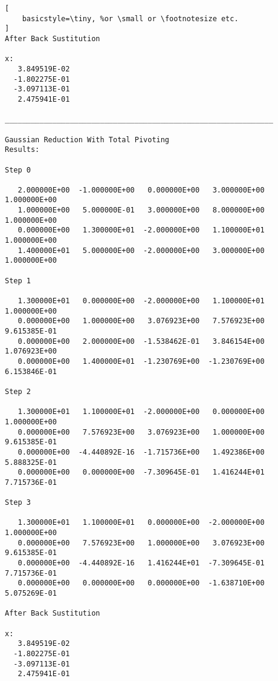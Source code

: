 \documentclass{article}
\begin{document}
\begin{lstlisting}[
    basicstyle=\tiny, %or \small or \footnotesize etc.
]
After Back Sustitution

x:
   3.849519E-02
  -1.802275E-01
  -3.097113E-01
   2.475941E-01

______________________________________________________________

Gaussian Reduction With Total Pivoting
Results:

Step 0

   2.000000E+00  -1.000000E+00   0.000000E+00   3.000000E+00   1.000000E+00
   1.000000E+00   5.000000E-01   3.000000E+00   8.000000E+00   1.000000E+00
   0.000000E+00   1.300000E+01  -2.000000E+00   1.100000E+01   1.000000E+00
   1.400000E+01   5.000000E+00  -2.000000E+00   3.000000E+00   1.000000E+00

Step 1

   1.300000E+01   0.000000E+00  -2.000000E+00   1.100000E+01   1.000000E+00
   0.000000E+00   1.000000E+00   3.076923E+00   7.576923E+00   9.615385E-01
   0.000000E+00   2.000000E+00  -1.538462E-01   3.846154E+00   1.076923E+00
   0.000000E+00   1.400000E+01  -1.230769E+00  -1.230769E+00   6.153846E-01

Step 2

   1.300000E+01   1.100000E+01  -2.000000E+00   0.000000E+00   1.000000E+00
   0.000000E+00   7.576923E+00   3.076923E+00   1.000000E+00   9.615385E-01
   0.000000E+00  -4.440892E-16  -1.715736E+00   1.492386E+00   5.888325E-01
   0.000000E+00   0.000000E+00  -7.309645E-01   1.416244E+01   7.715736E-01

Step 3

   1.300000E+01   1.100000E+01   0.000000E+00  -2.000000E+00   1.000000E+00
   0.000000E+00   7.576923E+00   1.000000E+00   3.076923E+00   9.615385E-01
   0.000000E+00  -4.440892E-16   1.416244E+01  -7.309645E-01   7.715736E-01
   0.000000E+00   0.000000E+00   0.000000E+00  -1.638710E+00   5.075269E-01

After Back Sustitution

x:
   3.849519E-02
  -1.802275E-01
  -3.097113E-01
   2.475941E-01


\end{lstlisting}
\end{document}
